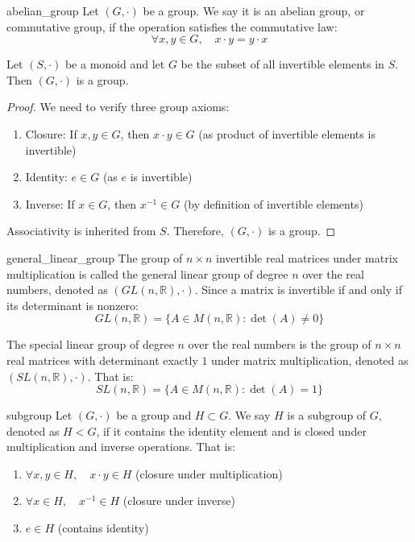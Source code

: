 \begin{definition}{abelian_group}
  Let $(G,\cdot)$ be a group. We say it is an abelian group, or commutative group, if the operation satisfies the commutative law:
  \[
    \forall x,y \in G, \quad x \cdot y = y \cdot x
  \]
\end{definition}

\begin{lemma}
  Let $(S,\cdot)$ be a monoid and let $G$ be the subset of all invertible elements in $S$. Then $(G,\cdot)$ is a group.
\end{lemma}

\begin{proof}
  We need to verify three group axioms:
  \begin{enumerate}
    \item Closure: If $x,y \in G$, then $x \cdot y \in G$ (as product of invertible elements is invertible)
    \item Identity: $e \in G$ (as $e$ is invertible)
    \item Inverse: If $x \in G$, then $x^{-1} \in G$ (by definition of invertible elements)
  \end{enumerate}
  Associativity is inherited from $S$. Therefore, $(G,\cdot)$ is a group.
\end{proof}

\begin{definition}{general_linear_group}
  The group of $n \times n$ invertible real matrices under matrix multiplication is called the general linear group of degree $n$ over the real numbers, denoted as $(GL(n,\mathbb{R}),\cdot)$. Since a matrix is invertible if and only if its determinant is nonzero:
  \[
    GL(n,\mathbb{R}) = \{ A \in M(n,\mathbb{R}) : \det(A) \neq 0 \}
  \]
\end{definition}

\begin{definition}
  The special linear group of degree $n$ over the real numbers is the group of $n \times n$ real matrices with determinant exactly $1$ under matrix multiplication, denoted as $(SL(n,\mathbb{R}),\cdot)$. That is:
  \[
    SL(n,\mathbb{R}) = \{ A \in M(n,\mathbb{R}) : \det(A) = 1 \}
  \]
\end{definition}

\begin{definition}[Subgroup]{subgroup}
  Let $(G,\cdot)$ be a group and $H \subset G$. We say $H$ is a subgroup of $G$, denoted as $H < G$, if it contains the identity element and is closed under multiplication and inverse operations. That is:
  \begin{enumerate}
    \item $\forall x,y \in H, \quad x \cdot y \in H$ \quad (closure under multiplication)
    \item $\forall x \in H, \quad x^{-1} \in H$ \quad (closure under inverse)
    \item $e \in H$ \quad (contains identity)
  \end{enumerate}
\end{definition}

